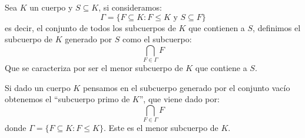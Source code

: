 \begin{definicion}
    Sea $K$ un cuerpo y $S\subseteq K$, si consideramos:
    \begin{equation*}
        \Gamma = \{F\subseteq K : F\leq K \text{\ y\ } S\subseteq F\}
    \end{equation*}
    es decir, el conjunto de todos los subcuerpos de $K$ que contienen a $S$, definimos el subcuerpo de $K$ generado por $S$ como el subcuerpo:
    \begin{equation*}
        \bigcap_{F\in \Gamma} F
    \end{equation*}
    Que se caracteriza por ser el menor subcuerpo de $K$ que contiene a $S$.
\end{definicion}

\begin{definicion}
    Si dado un cuerpo $K$ pensamos en el subcuerpo generado por el conjunto vacío obtenemos el ``subcuerpo primo de $K$'', que viene dado por:
    \begin{equation*}
        \bigcap_{F\in \Gamma} F
    \end{equation*}
    donde $\Gamma = \{F\subseteq K : F\leq K\}$. Este es el menor subcuerpo de $K$.
\end{definicion}

